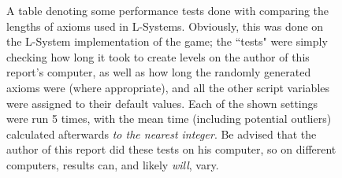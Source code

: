 \begin{figure}[H]
\begin{center}
{\begin{tabular}{|c|c|c|c|}
    \end{tabular}%
    }
    \end{center}
    \caption{A table denoting some performance tests done with comparing the lengths of axioms used in L-Systems. Obviously, this was done on the L-System implementation of the game; the ``tests" were simply checking how long it took to create levels on the author of this report's computer, as well as how long the randomly generated axioms were (where appropriate), and all the other script variables were assigned to their default values. Each of the shown settings were run 5 times, with the mean time (including potential outliers) calculated afterwards \textit{to the nearest integer}. Be advised that the author of this report did these tests on his computer, so on different computers, results can, and likely \textit{will}, vary.}
    \label{fig:table3}
\end{figure}

